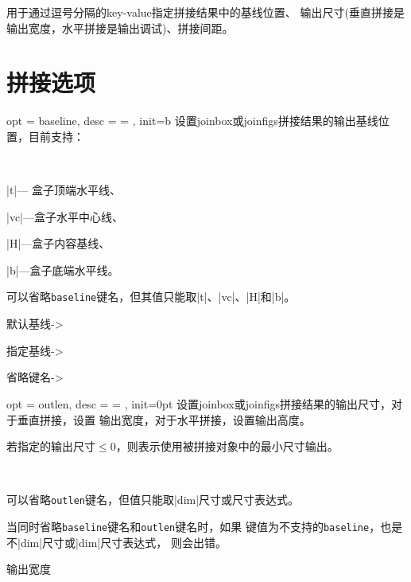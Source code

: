\documentclass[full]{l3doc}
\begin{document}
\begin{documentation}
\begin{function}{\joinset}
\end{function}

  用于通过逗号分隔的key-value指定拼接结果中的基线位置、
  输出尺寸(垂直拼接是输出宽度，水平拼接是输出调试)、拼接间距。

\section{拼接选项}

\begin{option}{ opt = baseline, desc = {= }, init=b }
  设置joinbox或joinfigs拼接结果的输出基线位置，目前支持：
\end{option}\\
\begin{Description}
  \item |t|--- 盒子顶端水平线、
  \item |vc|---盒子水平中心线、
  \item |H|---盒子内容基线、
  \item |b|---盒子底端水平线。
\end{Description}
\begin{notezh}
  可以省略\texttt{baseline}键名，但其值只能取|t|、|vc|、|H|和|b|。
\end{notezh}

\begin{SideBySideExample}[frame=single,numbers=left,xrightmargin=.45\linewidth,gobble=2]
  默认基线->

  指定基线->

  省略键名->
\end{SideBySideExample}

\bigskip

\begin{option}{ opt = outlen, desc = {= }, init=0pt }
  设置joinbox或joinfigs拼接结果的输出尺寸，对于垂直拼接，设置
  输出宽度，对于水平拼接，设置输出高度。

  若指定的输出尺寸$\le 0$，则表示使用被拼接对象中的最小尺寸输出。
\end{option}\\
\begin{notezh}
  可以省略\texttt{outlen}键名，但值只能取|dim|尺寸或尺寸表达式。

  当同时省略\texttt{baseline}键名和\texttt{outlen}键名时，如果
  键值为不支持的\texttt{baseline}，也是不|dim|尺寸或|dim|尺寸表达式，
  则会出错。
\end{notezh}
\begin{SideBySideExample}[frame=single,numbers=left,xrightmargin=.45\linewidth,gobble=2]
  输出宽度


\end{SideBySideExample}
\end{documentation}
\end{document}
